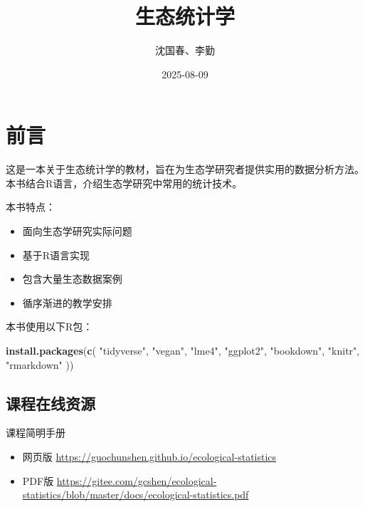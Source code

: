 \documentclass[
]{book}
\title{生态统计学}
\author{沈国春、李勤}
\date{2025-08-09}
\newenvironment{Shaded}{\begin{snugshade}}{\end{snugshade}}
\newcommand{\FunctionTok}[1]{\textcolor[rgb]{0.13,0.29,0.53}{\textbf{#1}}}
\newcommand{\NormalTok}[1]{#1}
\newcommand{\StringTok}[1]{\textcolor[rgb]{0.31,0.60,0.02}{#1}}
\providecommand{\tightlist}{%
  \setlength{\itemsep}{0pt}\setlength{\parskip}{0pt}}
\begin{document}
\maketitle

{
\setcounter{tocdepth}{1}
\tableofcontents
}
\hypertarget{ux524dux8a00}{%
\chapter*{前言}\label{ux524dux8a00}}

这是一本关于生态统计学的教材，旨在为生态学研究者提供实用的数据分析方法。本书结合R语言，介绍生态学研究中常用的统计技术。

本书特点：

\begin{itemize}
\tightlist
\item
  面向生态学研究实际问题
\item
  基于R语言实现
\item
  包含大量生态数据案例
\item
  循序渐进的教学安排
\end{itemize}

本书使用以下R包：

\begin{Shaded}
\begin{Highlighting}[]
\FunctionTok{install.packages}\NormalTok{(}\FunctionTok{c}\NormalTok{(}
  \StringTok{"tidyverse"}\NormalTok{, }\StringTok{"vegan"}\NormalTok{, }\StringTok{"lme4"}\NormalTok{, }\StringTok{"ggplot2"}\NormalTok{, }
  \StringTok{"bookdown"}\NormalTok{, }\StringTok{"knitr"}\NormalTok{, }\StringTok{"rmarkdown"}
\NormalTok{))}
\end{Highlighting}
\end{Shaded}

\hypertarget{ux8bfeux7a0bux5728ux7ebfux8d44ux6e90}{%
\section{课程在线资源}\label{ux8bfeux7a0bux5728ux7ebfux8d44ux6e90}}

课程简明手册

\begin{itemize}
\tightlist
\item
  网页版 \url{https://guochunshen.github.io/ecological-statistics}
\item
  PDF版 \url{https://gitee.com/gcshen/ecological-statistics/blob/master/docs/ecological-statistics.pdf}
\end{itemize}
\end{document}
